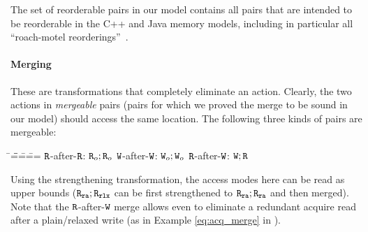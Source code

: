 The set of reorderable pairs in our model contains all pairs that are intended to be reorderable in the C++ 
and Java memory models,
including in particular all ``roach-motel reorderings''~\cite{c11comp,sevcik:jmm}.


\paragraph{Merging}
These are transformations that completely eliminate an action.
Clearly, the two actions in \emph{mergeable} pairs (pairs for which we proved the merge to be sound in our model)
should access the same location. The following three kinds of pairs are mergeable:
\begin{tabbing}
\hspace{1.4cm}\=\hspace{1.5cm}=\=\hspace{1.4cm}\=\hspace{1.5cm}=\=\hspace{1.4cm}=\=\hspace{1.5cm}=\kill
 $\texttt{R}$-after-$\texttt{R}$: \>  $\texttt{R}_o;\texttt{R}_o$ \>  $\texttt{W}$-after-$\texttt{W}$: \>   $\texttt{W}_o;\texttt{W}_o$ \>  $\texttt{R}$-after-$\texttt{W}$: \> $\texttt{W};\texttt{R}$
\end{tabbing} 

Using the strengthening transformation, the access modes here can be read as upper bounds
(\eg $\texttt{R}_{\texttt{ra}};\texttt{R}_{\texttt{rlx}}$ can be first strengthened to $\texttt{R}_{\texttt{ra}};\texttt{R}_{\texttt{ra}}$ and then merged).
Note that the  $\texttt{R}$-after-$\texttt{W}$ merge allows 
even to eliminate a redundant acquire read after a plain/relaxed write (as in Example \ref{eq:acq_merge} in ).

